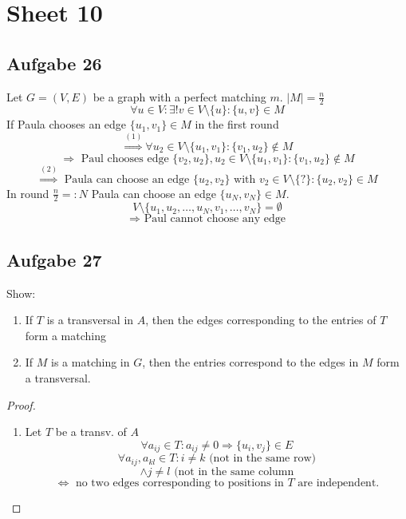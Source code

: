 \documentclass[12pt,oneside,a4paper,parskip=on,fleqn]{scrartcl}
\begin{document}
\section{Sheet 10} %
\label{sec:sheet_10}
	\subsection{Aufgabe 26} %
	\label{sub:aufgabe_26}
	Let $G=(V,E)$ be a graph with a perfect matching $m$. $|M|=\frac{n}{2}$
	\begin{equation}
		\forall u\in V: \exists! v\in V\setminus\{u\}:\{u,v\}\in M
	\end{equation}
	If Paula chooses an edge $\{u_1,v_1\}\in M$ in the first round
	\[
		\overset{(1)}{\Rightarrow} \forall u_2\in V\setminus\{u_1,v_1\}:\{v_1,u_2\}\not\in M
	\]
	\[
		\Rightarrow \text{ Paul chooses edge } \{v_2,u_2\},u_2\in V\setminus\{u_1,v_1\}:\{v_1,u_2\}\not\in M
	\]
	\[
		\overset{(2)}{\Rightarrow} \text{ Paula can choose an edge } \{u_2,v_2\} \text{ with } v_2\in V\setminus\{?\}:\{u_2,v_2\}\in M
	\]
	In round $\frac{n}{2} =: N$ Paula can choose an edge $\{u_N,v_N\}\in M$.
	\[
		V\setminus\{u_1,u_2,\ldots,u_N,v_1,\ldots,v_N\}=\emptyset
	\]
	\[
		\Rightarrow \text{ Paul cannot choose any edge}
	\]

	\subsection{Aufgabe 27} %
	\label{sub:aufgabe_27}
	Show:
	\begin{enumerate}[(1)]
		\item If $T$ is a transversal in $A$, then the edges corresponding to the entries of $T$ form a matching
		\item If $M$ is a matching in $G$, then the entries correspond to the edges in $M$ form a transversal.
	\end{enumerate}
	\begin{proof}
		\begin{enumerate}[(1)]
			\item Let $T$ be a transv. of $A$
			\[
				\forall a_{ij}\in T: a_{ij}\neq 0 \Rightarrow \{u_i,v_j\}\in E
			\]
			\[
				\forall a_{ij},a_{kl} \in T: i\neq k \text{ (not in the same row)}
			\]
			\[
				\wedge j\neq l \text{ (not in the same column}
			\]
			\[
				\Leftrightarrow \text{ no two edges corresponding to positions in } T \text{ are independent.}
			\]
		\end{enumerate}
	\end{proof}
\end{document}

